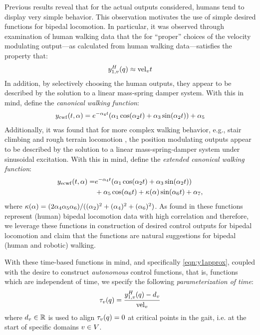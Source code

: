  Previous results \cite{ZYA2012,AVB:HSCC:11,PZA2012} reveal that for the actual outputs considered, humans tend to display very simple behavior.  This observation motivates the use of simple desired functions for bipedal locomotion. In particular, it was observed \cite{AVB:HSCC:11} through examination of human walking data that the for ``proper'' choices of the velocity modulating output---as calculated from human walking data---satisfies the property that:
\begin{align}
\label{eqn:y1approx}
  y_{1,v}^H(q) \approx \mathrm{vel}_v t
\end{align}
 In addition, by selectively choosing the human outputs, they appear to be described by the solution to a linear mass-spring damper system. With this in mind, define the \textit{canonical walking function}:
\begin{align}
 y_{\mathrm{cwf}} (t, \alpha) = e^{-\alpha_4 t} (\alpha_1 \cos( \alpha_2 t) + \alpha_3 \sin(\alpha_2 t) ) + \alpha_5
\end{align}
Additionally, it was found that for more complex walking behavior, e.g., stair climbing and rough terrain locomotion \cite{PZA2012,SA:SSRR:2012}, the position modulating outputs appear to be described by the solution to a linear mass-spring-damper system under sinusoidal excitation. With this in mind, define the \textit{extended canonical walking function}:
\begin{align}
\nonumber
 y_{\mathrm{ecwf}} (t, \alpha) = &e^{-\alpha_4 t} (\alpha_1 \cos( \alpha_2 t) + \alpha_3 \sin(\alpha_2 t) ) \\
 &+ \alpha_5 \cos(\alpha_6 t) + \kappa(\alpha) \sin(\alpha_6 t) + \alpha_7,
\end{align}
where $\kappa(\alpha) = (2\alpha_4\alpha_5\alpha_6)/((\alpha_2)^2+(\alpha_4)^2+(\alpha_6)^2)$. As found in \cite{Ames11} these functions represent (human) bipedal locomotion data with high correlation and therefore, we leverage these functions in construction of desired control outputs for bipedal locomotion and claim that the functions are natural suggestions for bipedal (human and robotic) walking.

With these time-based functions in mind, and specifically \eqref{eqn:y1approx}, coupled with the desire to construct \textit{autonomous} control functions, that is, functions which are independent of time, we specify the following \textit{parameterization of time}:
\begin{align}
 \tau_v(q) = \frac{y_{1,v}^H(q)-d_{v}}{\mathrm{vel}_v}
\end{align}
where $d_{v} \in \mathbb{R}$ is used to align $\tau_v(q)=0$ at critical points in the gait, i.e. at the start of specific domains $v \in V$.  

